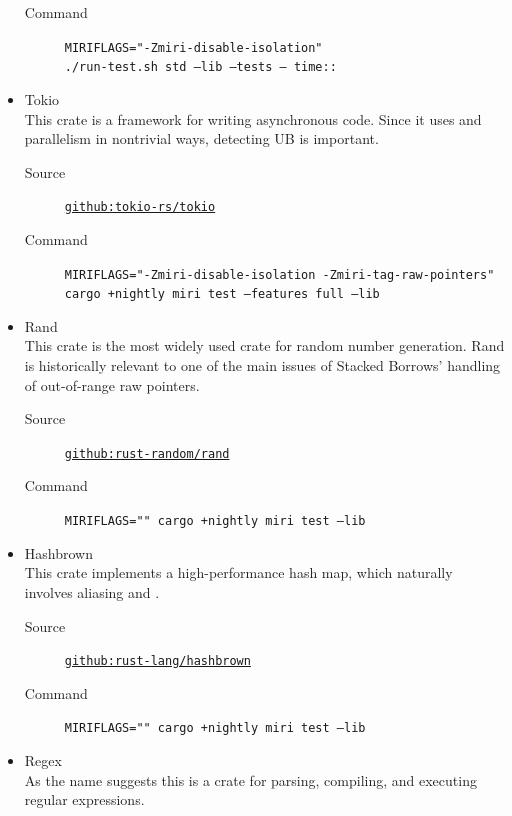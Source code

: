 \documentclass[a4paper,11pt]{article}
\theoremstyle{plain}
\theoremstyle{definition}
\theoremstyle{remark}
\newcommand{\tcode}[1]{\rstinline{#1}}
\begin{document}
\begin{itemize}
\begin{description}
            \item[Command] \texttt{MIRIFLAGS="-Zmiri-disable-isolation"}\\
                \texttt{./run-test.sh std --lib --tests -- time::}
        \end{description}
    \item Tokio\\
        This crate is a framework for writing asynchronous code. Since it uses \tcode{unsafe} and
        parallelism in nontrivial ways, detecting UB is important.
        \begin{description}
            \item[Source] \href{https://github.com/tokio-rs/tokio}{\texttt{github:tokio-rs/tokio}}
            \item[Command] \texttt{MIRIFLAGS="-Zmiri-disable-isolation -Zmiri-tag-raw-pointers"} \\
                \texttt{cargo +nightly miri test --features full --lib}
        \end{description}
    \item Rand\\
        This crate is the most widely used crate for random number generation.
        Rand is historically relevant to one of the main
        issues \cite{issue_raw_range_strict}
        of Stacked Borrows' handling of out-of-range raw pointers.
        \begin{description}
            \item[Source] \href{https://github.com/rust-random/rand}{\texttt{github:rust-random/rand}}
            \item[Command] \texttt{MIRIFLAGS="" cargo +nightly miri test --lib}
        \end{description}
    \item Hashbrown\\
        This crate implements a high-performance hash map, which naturally involves aliasing and \tcode{unsafe}.
        \begin{description}
            \item[Source] \href{https://github.com/rust-lang/hashbrown}{\texttt{github:rust-lang/hashbrown}}
            \item[Command] \texttt{MIRIFLAGS="" cargo +nightly miri test --lib}
        \end{description}
    \item Regex\\
        As the name suggests this is a crate for parsing, compiling, and executing regular expressions.

\end{itemize}
\end{document}
